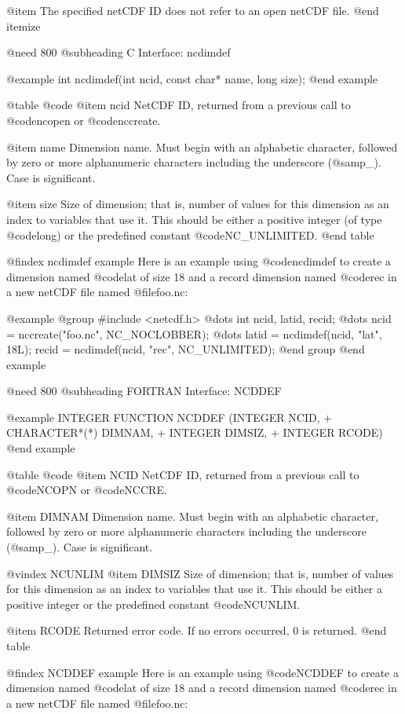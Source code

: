 @item
The specified netCDF ID does not refer to an open netCDF file.
@end itemize

@need 800
@subheading C Interface:  ncdimdef

@example
int ncdimdef(int ncid, const char* name, long size);
@end example

@table @code
@item ncid
NetCDF ID, returned from a previous call to @code{ncopen} or @code{nccreate}.

@item name
Dimension name.  Must begin with an alphabetic character, followed by
zero or more alphanumeric characters including the underscore
(@samp{_}).  Case is significant.

@item size
Size of dimension; that is, number of values for this dimension as an
index to variables that use it.  This should be either a positive
integer (of type @code{long}) or the predefined constant @code{NC_UNLIMITED}.
@end table

@findex ncdimdef example
Here is an example using @code{ncdimdef} to create a dimension named
@code{lat} of size 18 and a record dimension named @code{rec} in a new
netCDF file named @file{foo.nc}:

@example
@group
#include <netcdf.h>
   @dots{}
int ncid, latid, recid;
   @dots{}
ncid = nccreate("foo.nc", NC_NOCLOBBER);
   @dots{}
latid = ncdimdef(ncid, "lat", 18L);
recid = ncdimdef(ncid, "rec", NC_UNLIMITED);
@end group
@end example

@need 800
@subheading FORTRAN Interface:  NCDDEF

@example
      INTEGER FUNCTION NCDDEF (INTEGER NCID,
     +                   CHARACTER*(*) DIMNAM,
     +                   INTEGER DIMSIZ,
     +                   INTEGER RCODE)
@end example

@table @code
@item NCID
NetCDF ID, returned from a previous call to @code{NCOPN} or @code{NCCRE}.

@item DIMNAM
Dimension name.  Must begin with an alphabetic character, followed by
zero or more alphanumeric characters including the underscore
(@samp{_}).  Case is significant.

@vindex NCUNLIM
@item DIMSIZ
Size of dimension; that is, number of values for this dimension as an
index to variables that use it.  This should be either a positive
integer or the predefined constant @code{NCUNLIM}.

@item RCODE
Returned error code.  If no errors occurred, 0 is returned.
@end table

@findex NCDDEF example
Here is an example using @code{NCDDEF} to create a dimension named
@code{lat} of size 18 and a record dimension named @code{rec} in a new
netCDF file named @file{foo.nc}:

